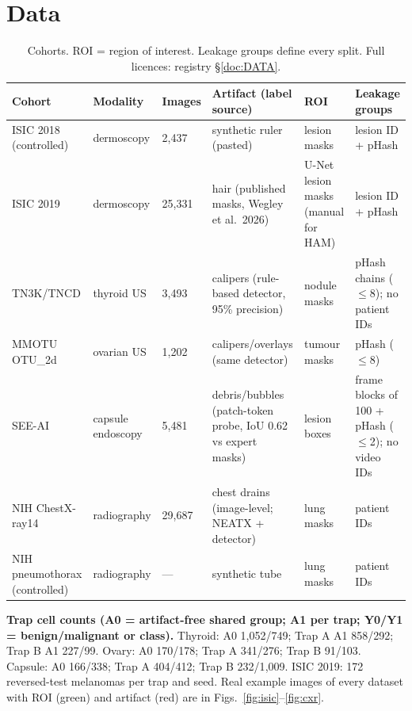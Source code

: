 \documentclass[10pt,a4paper]{article}
\begin{document}
\section{Data}\label{sec:data}
\begin{table}[H]\centering\small
\caption{Cohorts. ROI = region of interest. Leakage groups define every split. Full licences: registry \S\ref{doc:DATA}.}
\begin{tabular}{p{2.2cm}p{1.8cm}p{1.2cm}p{3.6cm}p{2.2cm}p{4.3cm}}\toprule
Cohort & Modality & Images & Artifact (label source) & ROI & Leakage groups \\\midrule
ISIC 2018 (controlled) & dermoscopy & 2{,}437 & synthetic ruler (pasted) & lesion masks & lesion ID + pHash \\
ISIC 2019 & dermoscopy & 25{,}331 & hair (published masks, Wegley et al.\ 2026) & U-Net lesion masks (manual for HAM) & lesion ID + pHash \\
TN3K/TNCD & thyroid US & 3{,}493 & calipers (rule-based detector, 95\% precision) & nodule masks & pHash chains ($\le$8); no patient IDs \\
MMOTU OTU\_2d & ovarian US & 1{,}202 & calipers/overlays (same detector) & tumour masks & pHash ($\le$8) \\
SEE-AI & capsule endoscopy & 5{,}481 & debris/bubbles (patch-token probe, IoU 0.62 vs expert masks) & lesion boxes & frame blocks of 100 + pHash ($\le$2); no video IDs \\
NIH ChestX-ray14 & radiography & 29{,}687 & chest drains (image-level; NEATX + detector) & lung masks & patient IDs \\
NIH pneumothorax (controlled) & radiography & --- & synthetic tube & lung masks & patient IDs \\\bottomrule
\end{tabular}\end{table}
\textbf{Trap cell counts (A0 = artifact-free shared group; A1 per trap; Y0/Y1 = benign/malignant or class).}
Thyroid: A0 1{,}052/749; Trap A A1 858/292; Trap B A1 227/99. Ovary: A0 170/178; Trap A 341/276; Trap B 91/103.
Capsule: A0 166/338; Trap A 404/412; Trap B 232/1{,}009. ISIC 2019: 172 reversed-test melanomas per trap and seed.
Real example images of every dataset with ROI (green) and artifact (red) are in Figs.~\ref{fig:isic}--\ref{fig:cxr}.
\end{document}
